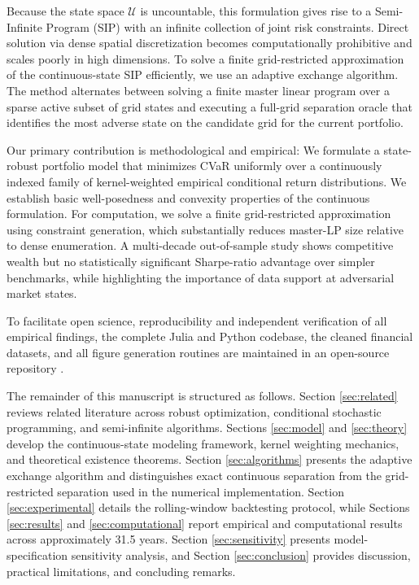 \documentclass[smallextended]{svjour3}
\begin{document}
Because the state space $\mathcal{U}$ is uncountable, this formulation gives rise to a Semi-Infinite Program (SIP) with an infinite collection of joint risk constraints. Direct solution via dense spatial discretization becomes computationally prohibitive and scales poorly in high dimensions. To solve a finite grid-restricted approximation of the continuous-state SIP efficiently, we use an adaptive exchange algorithm. The method alternates between solving a finite master linear program over a sparse active subset of grid states and executing a full-grid separation oracle that identifies the most adverse state on the candidate grid for the current portfolio.

Our primary contribution is methodological and empirical: We formulate a state-robust portfolio model that minimizes CVaR uniformly over a continuously indexed family of kernel-weighted empirical conditional return distributions. We establish basic well-posedness and convexity properties of the continuous formulation. For computation, we solve a finite grid-restricted approximation using constraint generation, which substantially reduces master-LP size relative to dense enumeration. A multi-decade out-of-sample study shows competitive wealth but no statistically significant Sharpe-ratio advantage over simpler benchmarks, while highlighting the importance of data support at adversarial market states.

To facilitate open science, reproducibility and independent verification of all empirical findings, the complete Julia and Python codebase, the cleaned financial datasets, and all figure generation routines are maintained in an open-source repository \cite{bezoui2026robust}.

The remainder of this manuscript is structured as follows. Section \ref{sec:related} reviews related literature across robust optimization, conditional stochastic programming, and semi-infinite algorithms. Sections \ref{sec:model} and \ref{sec:theory} develop the continuous-state modeling framework, kernel weighting mechanics, and theoretical existence theorems. Section \ref{sec:algorithms} presents the adaptive exchange algorithm and distinguishes exact continuous separation from the grid-restricted separation used in the numerical implementation. Section \ref{sec:experimental} details the rolling-window backtesting protocol, while Sections \ref{sec:results} and \ref{sec:computational} report empirical and computational results across approximately 31.5 years. Section \ref{sec:sensitivity} presents model-specification sensitivity analysis, and Section \ref{sec:conclusion} provides discussion, practical limitations, and concluding remarks.
\end{document}

